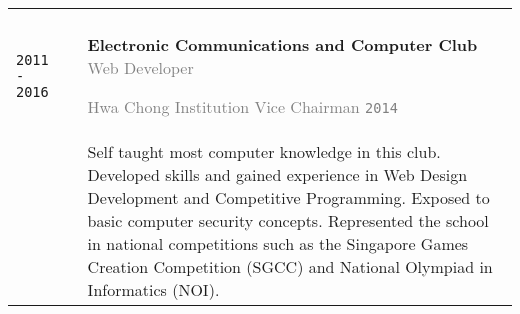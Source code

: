 \documentclass[11pt]{article}
\newcommand{\monoSp}[1]{{\usefont{T1}{rbtm}{m}{n} #1}}
\newcommand{\urllinkout}[2]{\href{#1}{\textcolor{text_link}{\small \texttt{#2}}}}
\newcommand{\code}[1]{\monoSp{#1}}
\begin{document}
{\begin{tabularx}{\textwidth}{@{}l p{0.20cm} X @{}}
{		}\\
		{\texttt{\large 2011 - 2016}} & & \textbf{Electronic Communications and Computer Club %
		} \hfill\textcolor{gray}{Web Developer} \par \textcolor{gray}{Hwa Chong Institution} \hfill\textcolor{gray}{Vice Chairman \texttt{2014}}\\[-0.5em]
		&& {\small Self taught most computer knowledge in this club. Developed skills and gained experience in Web Design Development and Competitive Programming. Exposed to basic computer security concepts. Represented the school in national competitions such as the Singapore Games Creation Competition {\footnotesize (SGCC)} and National Olympiad in Informatics {\footnotesize (NOI)}.}
	\end{tabularx}
}
\end{document}

